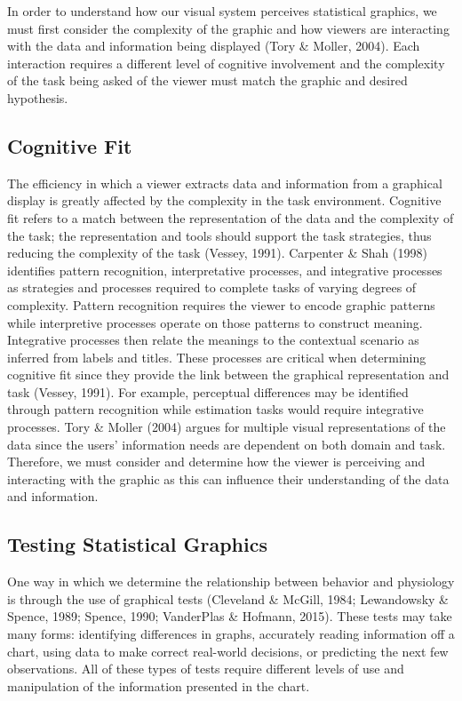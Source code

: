 \documentclass[print]{nuthesis}
\begin{document}
In order to understand how our visual system perceives statistical graphics, we must first consider the complexity of the graphic and how viewers are interacting with the data and information being displayed (Tory \& Moller, 2004).
Each interaction requires a different level of cognitive involvement and the complexity of the task being asked of the viewer must match the graphic and desired hypothesis.

\hypertarget{cognitive-fit}{%
\subsection{Cognitive Fit}\label{cognitive-fit}}

The efficiency in which a viewer extracts data and information from a graphical display is greatly affected by the complexity in the task environment.
Cognitive fit refers to a match between the representation of the data and the complexity of the task; the representation and tools should support the task strategies, thus reducing the complexity of the task (Vessey, 1991).
Carpenter \& Shah (1998) identifies pattern recognition, interpretative processes, and integrative processes as strategies and processes required to complete tasks of varying degrees of complexity.
Pattern recognition requires the viewer to encode graphic patterns while interpretive processes operate on those patterns to construct meaning.
Integrative processes then relate the meanings to the contextual scenario as inferred from labels and titles.
These processes are critical when determining cognitive fit since they provide the link between the graphical representation and task (Vessey, 1991).
For example, perceptual differences may be identified through pattern recognition while estimation tasks would require integrative processes.
Tory \& Moller (2004) argues for multiple visual representations of the data since the users' information needs are dependent on both domain and task.
Therefore, we must consider and determine how the viewer is perceiving and interacting with the graphic as this can influence their understanding of the data and information.

\hypertarget{testing-statistical-graphics}{%
\subsection{Testing Statistical Graphics}\label{testing-statistical-graphics}}

One way in which we determine the relationship between behavior and physiology is through the use of graphical tests (Cleveland \& McGill, 1984; Lewandowsky \& Spence, 1989; Spence, 1990; VanderPlas \& Hofmann, 2015).
These tests may take many forms: identifying differences in graphs, accurately reading information off a chart, using data to make correct real-world decisions, or predicting the next few observations.
All of these types of tests require different levels of use and manipulation of the information presented in the chart.
\end{document}
